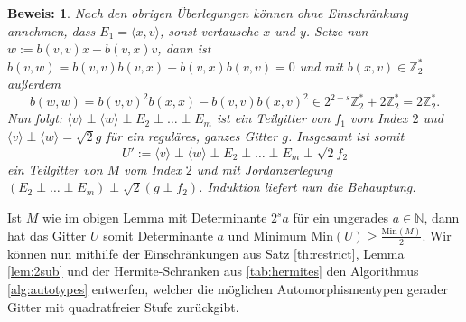 \documentclass[12pt,a4paper,halfparskip,headsepline,bibtotocnumbered]{scrreprt}
\theoremstyle{nummermitklammern}
\theoremstyle{nonumberbreak}
\newtheorem{beweis}{Beweis:}
\newcommand{\N}{\mathbb{N}}
\newcommand{\Z}{\mathbb{Z}}
\newcommand{\Min}{\text{Min}}
\begin{document}
\begin{beweis}
	Nach den obrigen Überlegungen können ohne Einschränkung annehmen, dass\linebreak
	$E_1 = \langle x,v \rangle$, sonst vertausche $x$ und $y$. Setze nun $w := b(v,v) x - b(v,x) v$, dann ist $b(v,w) = b(v,v) b(v,x) - b(v,x) b(v,v) = 0$ und mit $b(x,v) \in \Z_2^\ast$ außerdem 	\begin{equation*}
		b(w,w) = b(v,v)^2 b(x,x) - b(v,v) b(x,v)^2 \in 2^{2+s} \Z_2^\ast + 2 \Z_2^\ast = 2 \Z_2^\ast.
	\end{equation*}
	Nun folgt: $\langle v \rangle \perp  \langle w \rangle \perp E_2 \perp \dots \perp E_m$ ist ein Teilgitter von $f_1$ vom Index $2$ und
	$\langle v \rangle \perp \langle w \rangle = \sqrt{2} g$ für ein reguläres, ganzes Gitter $g$. Insgesamt ist somit
	\begin{equation*}
		U' := \langle v \rangle \perp \langle w \rangle \perp E_2 \perp \dots \perp E_m \perp \sqrt{2}f_2
	\end{equation*}
	ein Teilgitter von $M$ vom Index $2$ und mit Jordanzerlegung $\left( E_2 \perp \dots \perp E_m \right) \perp \sqrt{2} \left( g \perp f_2 \right)$. Induktion liefert nun die Behauptung.
\end{beweis}

Ist $M$ wie im obigen Lemma mit Determinante $2^s a$ für ein ungerades $a \in \N$, dann hat das Gitter $U$ somit Determinante $a$ und Minimum $\Min(U) \geq \frac{\Min(M)}{2}$.
Wir können nun mithilfe der Einschränkungen aus Satz \eqref{th:restrict}, Lemma \eqref{lem:2sub} und der Hermite-Schranken aus \eqref{tab:hermites} den Algorithmus \eqref{alg:autotypes} entwerfen, welcher die möglichen Automorphismentypen gerader Gitter mit quadratfreier Stufe zurückgibt.
\end{document}
